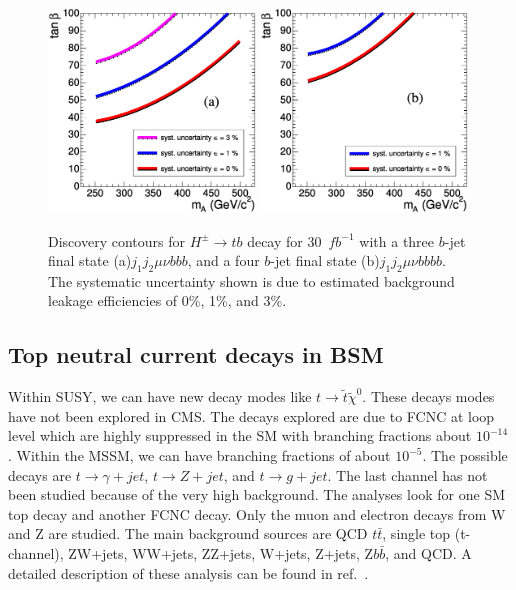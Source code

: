 \documentclass{cimento}
\begin{document}
\begin{figure}
\centering
\includegraphics[width=0.49\textwidth]{fig04a.ps}
\includegraphics[width=0.49\textwidth]{fig04b.ps}
\caption{Discovery contours for $H^{\pm}\rightarrow tb$ decay for 30~$fb^{-1}$
with a three $b$-jet final state (a)$j_1j_2\mu\nu bbb$, and a four $b$-jet final state
(b)$j_1j_2\mu\nu bbbb$. The systematic uncertainty shown is due to
estimated background leakage efficiencies of 0\%, 1\%, and 3\%.}
\label{fig:fig4}
\end{figure}


\subsection{Top neutral current decays in BSM}
\label{sec:FCNC}

Within SUSY, we can have new decay modes like $t\rightarrow\tilde{t}\tilde{\chi}^0$.
These decays modes have not been explored in CMS. The decays explored are
due to FCNC at loop level which are highly suppressed in the SM with branching
fractions about $10^{-14}$. Within the MSSM, we can have branching fractions of
about $10^{-5}$. The possible decays are $t\rightarrow \gamma+jet$, 
$t\rightarrow Z+jet$, and $t\rightarrow g+jet$. The last channel has not
been studied because of the very high background. The analyses look for one SM
top decay and another FCNC decay. Only the muon and electron decays from W and Z
are studied. The main background sources are QCD $t\bar{t}$, single top (t-channel),
ZW+jets, WW+jets, ZZ+jets, W+jets, Z+jets, Z$b\bar{b}$, and QCD. A detailed description of these analysis
can be found in ref.~\cite{ref:ptdr2}.
\end{document}
